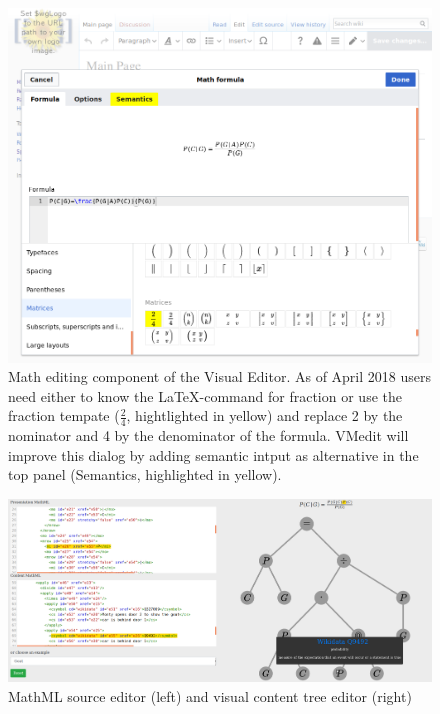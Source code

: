 \documentclass{llncs}
\begin{document}
\begin{figure}[t]
\includegraphics[width=\textwidth]{images/overview.png}
\caption{Math editing component of the Visual Editor.
 As of April 2018 users need either to know the {\LaTeX}-command for fraction or use the fraction tempate ($\frac{2}{4}$, hightlighted in yellow) and replace 2 by the nominator and 4 by the denominator of the formula.
 VMedit will improve this dialog by adding semantic intput as alternative in the top panel (Semantics, highlighted in yellow).}\label{fig.overview}
\end{figure}
\begin{figure}[t]
\includegraphics[width=\textwidth]{images/vis.png}
\caption{MathML source editor (left) and visual content tree editor (right)}
\end{figure}
\printbibliography[keyword=primary]
\end{document}

